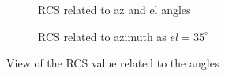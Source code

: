 \documentclass[12pt,DIV14,BCOR12mm,a4paper,footinclude=false,headinclude,parskip=half-,twoside,openright,cleardoublepage=empty,toc=index,bibliography=totoc,listof=totoc]{scrreprt}
\numberwithin{equation}{chapter}
\begin{document}
\begin{figure}
    \centering
    \begin{subfigure}{0.45\textwidth}
        \centering
        \caption{RCS related to az and el angles}
        \label{rcs related to azimuth and elevation angles}
    \end{subfigure}
    \begin{subfigure}{0.45\textwidth}
        \centering
        \caption{RCS related to azimuth as $el=35^{\circ}$}
        \label{rcs related to azimuth as el=35deg}
    \end{subfigure}
    \caption{View of the RCS value related to the angles}
    \label{view of rcs value related to the angles}
\end{figure}
\end{document}
